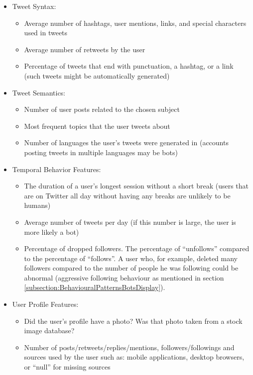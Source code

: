     \begin{itemize}
        \item Tweet Syntax: 
            \begin{itemize}
                \item Average number of hashtags, user mentions, links, and special characters used in tweets
                \item Average number of retweets by the user
                \item Percentage of tweets that end with punctuation, a hashtag, or a link (such tweets might be automatically generated)
            \end{itemize}
        \item Tweet Semantics:    
            \begin{itemize}
                \item Number of user posts related to the chosen subject
                \item Most frequent topics that the user tweets about
                \item Number of languages the user’s tweets were generated in (accounts posting tweets in multiple languages may be bots)
            \end{itemize}
        \item Temporal Behavior Features:
            \begin{itemize}
                \item The duration of a user’s longest session without a short break (users that are on Twitter all day without having any breaks are unlikely to be humans)
                \item Average number of tweets per day (if this number is large, the user is more likely a bot)
                \item Percentage of dropped followers. The percentage of “unfollows” compared to the percentage of “follows”. A user who, for example, deleted many followers compared to the number of people he was following could be abnormal (aggressive following behaviour as mentioned in section \ref{subsection:BehaviouralPatternsBotsDisplay}).
            \end{itemize}
        \item User Profile Features:
            \begin{itemize}
                \item Did the user’s profile have a photo? Was that photo taken from a stock image database?
                \item Number of posts/retweets/replies/mentions, followers/followings and sources used by the user such as: mobile applications, desktop browsers, or “null” for missing sources

\end{itemize}
\end{itemize}
